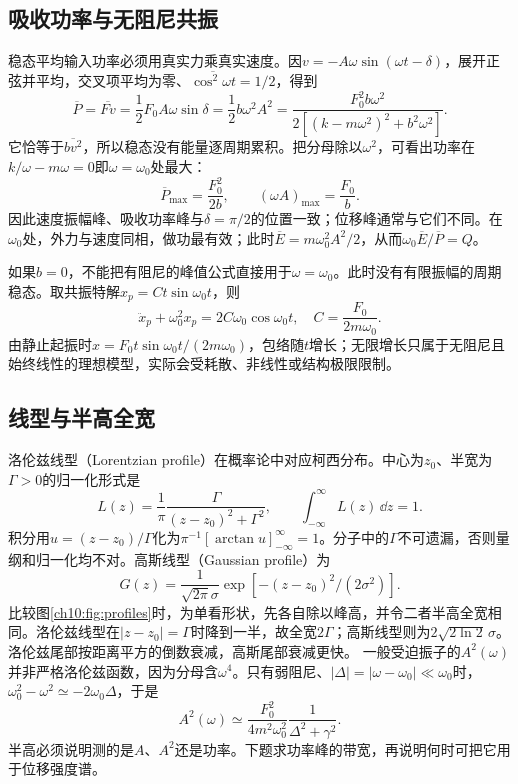 \subsection{吸收功率与无阻尼共振}
稳态平均输入功率必须用真实力乘真实速度。因$v=-A\omega\sin(\omega t-\delta)$，展开正弦并平均，交叉项平均为零、$\overline{\cos^2\omega t}=1/2$，得到
\begin{equation}\label{ch10:eq:power}
 \overline P=\overline{Fv}=\frac12F_0A\omega\sin\delta
 =\frac12b\omega^2A^2
 =\frac{F_0^2b\omega^2}{2[(k-m\omega^2)^2+b^2\omega^2]}.
\end{equation}
它恰等于$\overline{bv^2}$，所以稳态没有能量逐周期累积。把分母除以$\omega^2$，可看出功率在$k/\omega-m\omega=0$即$\omega=\omega_0$处最大：
\[
 \overline P_{\max}=\frac{F_0^2}{2b},\qquad
 (\omega A)_{\max}=\frac{F_0}{b}.
\]
因此速度振幅峰、吸收功率峰与$\delta=\pi/2$的位置一致；位移峰通常与它们不同。在$\omega_0$处，外力与速度同相，做功最有效；此时$\overline E=m\omega_0^2A^2/2$，从而$\omega_0\overline E/\overline P=Q$。

如果$b=0$，不能把有阻尼的峰值公式直接用于$\omega=\omega_0$。此时没有有限振幅的周期稳态。取共振特解$x_p=Ct\sin\omega_0t$，则
\[
 \ddot x_p+\omega_0^2x_p=2C\omega_0\cos\omega_0t,
 \quad C=\frac{F_0}{2m\omega_0}.
\]
由静止起振时$x=F_0t\sin\omega_0t/(2m\omega_0)$，包络随$t$增长；无限增长只属于无阻尼且始终线性的理想模型，实际会受耗散、非线性或结构极限限制。

\subsection{线型与半高全宽}
洛伦兹线型（Lorentzian profile）在概率论中对应柯西分布。中心为$z_0$、半宽为$\Gamma>0$的归一化形式是
\[
 L(z)=\frac1\pi\frac{\Gamma}{(z-z_0)^2+\Gamma^2},\qquad
 \int_{-\infty}^{\infty}L(z)\,\dd z=1.
\]
积分用$u=(z-z_0)/\Gamma$化为$\pi^{-1}[\arctan u]_{-\infty}^{\infty}=1$。分子中的$\Gamma$不可遗漏，否则量纲和归一化均不对。高斯线型（Gaussian profile）为
\[
 G(z)=\frac1{\sqrt{2\pi}\sigma}\exp[-(z-z_0)^2/(2\sigma^2)].
\]
比较图\ref{ch10:fig:profiles}时，为单看形状，先各自除以峰高，并令二者半高全宽相同。洛伦兹线型在$|z-z_0|=\Gamma$时降到一半，故全宽$2\Gamma$；高斯线型则为$2\sqrt{2\ln2}\,\sigma$。洛伦兹尾部按距离平方的倒数衰减，高斯尾部衰减更快。
\chTenProfileFigure
一般受迫振子的$A^2(\omega)$并非严格洛伦兹函数，因为分母含$\omega^4$。只有弱阻尼、$|\Delta|=|\omega-\omega_0|\ll\omega_0$时，$\omega_0^2-\omega^2\simeq-2\omega_0\Delta$，于是
\[
 A^2(\omega)\simeq\frac{F_0^2}{4m^2\omega_0^2}\frac1{\Delta^2+\gamma^2}.
\]
半高必须说明测的是$A$、$A^2$还是功率。下题求功率峰的带宽，再说明何时可把它用于位移强度谱。

